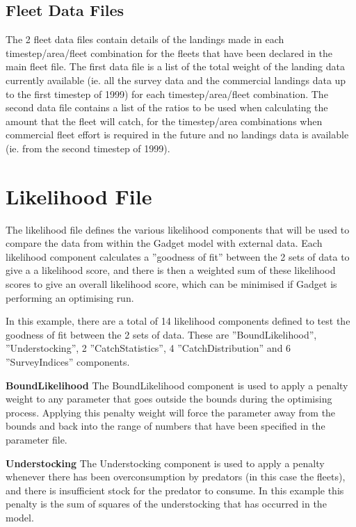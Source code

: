 \documentclass[10pt,twoside]{article}
\begin{document}
{\small }

\subsection{Fleet Data Files}
The 2 fleet data files contain details of the landings made in each timestep/area/fleet combination for the fleets that have been declared in the main fleet file.  The first data file is a list of the total weight of the landing data currently available (ie. all the survey data and the commercial landings data up to the first timestep of 1999) for each timestep/area/fleet combination.  The second data file contains a list of the ratios to be used when calculating the amount that the fleet will catch, for the timestep/area combinations when commercial fleet effort is required in the future and no landings data is available (ie. from the second timestep of 1999).

{\small }
{\small }

\section{Likelihood File}
The likelihood file defines the various likelihood components that will be used to compare the data from within the Gadget model with external data.  Each likelihood component calculates a ''goodness of fit'' between the 2 sets of data to give a a likelihood score, and there is then a weighted sum of these likelihood scores to give an overall likelihood score, which can be minimised if Gadget is performing an optimising run.

\bigskip
In this example, there are a total of 14 likelihood components defined to test the goodness of fit between the 2 sets of data.  These are ''BoundLikelihood'', ''Understocking'', 2 ''CatchStatistics'', 4 ''CatchDistribution'' and 6 ''SurveyIndices'' components.

\bigskip
{\bf BoundLikelihood}\newline
The BoundLikelihood component is used to apply a penalty weight to any parameter that goes outside the bounds during the optimising process.  Applying this penalty weight will force the parameter away from the bounds and back into the range of numbers that have been specified in the parameter file.

\bigskip
{\bf Understocking}\newline
The Understocking component is used to apply a penalty whenever there has been overconsumption by predators (in this case the fleets), and there is insufficient stock for the predator to consume.  In this example this penalty is the sum of squares of the understocking that has occurred in the model.
\end{document}
